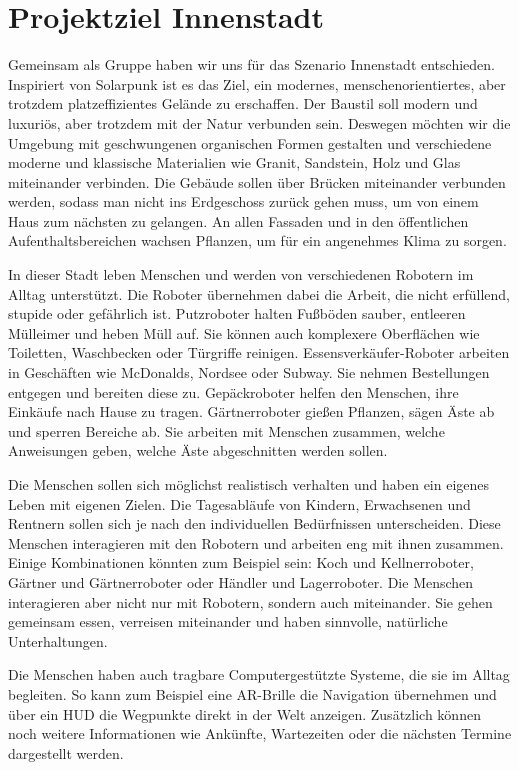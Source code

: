 
\section{Projektziel Innenstadt}

Gemeinsam als Gruppe haben wir uns für das Szenario Innenstadt entschieden. Inspiriert von Solarpunk ist es das Ziel, ein modernes, menschenorientiertes, aber trotzdem platzeffizientes Gelände zu erschaffen. Der Baustil soll modern und luxuriös, aber trotzdem mit der Natur verbunden sein. Deswegen möchten wir die Umgebung mit geschwungenen organischen Formen gestalten und verschiedene moderne und klassische Materialien wie Granit, Sandstein, Holz und Glas miteinander verbinden. Die Gebäude sollen über Brücken miteinander verbunden werden, sodass man nicht ins Erdgeschoss zurück gehen muss, um von einem Haus zum nächsten zu gelangen. An allen Fassaden und in den öffentlichen Aufenthaltsbereichen wachsen Pflanzen, um für ein angenehmes Klima zu sorgen.

In dieser Stadt leben Menschen und werden von verschiedenen Robotern im Alltag unterstützt. Die Roboter übernehmen dabei die Arbeit, die nicht erfüllend, stupide oder gefährlich ist. Putzroboter halten Fußböden sauber, entleeren Mülleimer und heben Müll auf. Sie können auch komplexere Oberflächen wie Toiletten, Waschbecken oder Türgriffe reinigen. Essensverkäufer-Roboter arbeiten in Geschäften wie McDonalds, Nordsee oder Subway. Sie nehmen Bestellungen entgegen und bereiten diese zu. Gepäckroboter helfen den Menschen, ihre Einkäufe nach Hause zu tragen. Gärtnerroboter gießen Pflanzen, sägen Äste ab und sperren Bereiche ab. Sie arbeiten mit Menschen zusammen, welche Anweisungen geben, welche Äste abgeschnitten werden sollen. 

Die Menschen sollen sich möglichst realistisch verhalten und haben ein eigenes Leben mit eigenen Zielen. Die Tagesabläufe von Kindern, Erwachsenen und Rentnern sollen sich je nach den individuellen Bedürfnissen unterscheiden. Diese Menschen interagieren mit den Robotern und arbeiten eng mit ihnen zusammen. Einige Kombinationen könnten zum Beispiel sein: Koch und Kellnerroboter, Gärtner und Gärtnerroboter oder Händler und Lagerroboter. Die Menschen interagieren aber nicht nur mit Robotern, sondern auch miteinander. Sie gehen gemeinsam essen, verreisen miteinander und haben sinnvolle, natürliche Unterhaltungen.

Die Menschen haben auch tragbare Computergestützte Systeme, die sie im Alltag begleiten. So kann zum Beispiel eine AR-Brille die Navigation übernehmen und über ein HUD die Wegpunkte direkt in der Welt anzeigen. Zusätzlich können noch weitere Informationen wie Ankünfte, Wartezeiten oder die nächsten Termine dargestellt werden.

